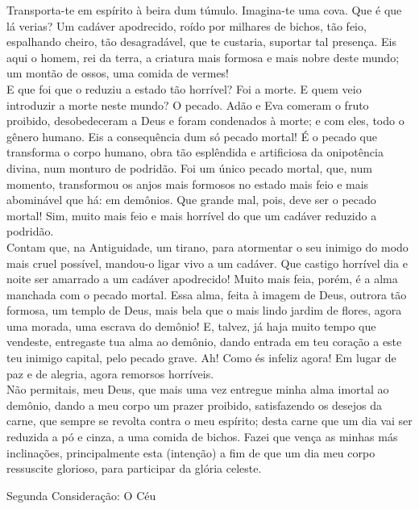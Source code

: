 \begin{flushleft}
    Transporta-te em espírito à beira dum túmulo. Imagina-te uma cova. Que é que lá verias? Um cadáver apodrecido, roído por milhares de bichos, tão feio, espalhando cheiro, tão desagradável, que te custaria, suportar tal presença. Eis aqui o homem, rei da terra, a criatura mais formosa e mais nobre deste mundo; um montão de ossos, uma comida de vermes!
    \vspace{.2cm} \\
    E que foi que o reduziu a estado tão horrível? Foi a morte. E quem veio introduzir a morte neste mundo? O pecado. Adão e Eva comeram o fruto proibido, desobedeceram a Deus e foram condenados à morte; e com eles, todo o gênero humano. Eis a consequência dum só pecado mortal! É o pecado que transforma o corpo humano, obra tão esplêndida e artificiosa da onipotência divina, num monturo de podridão. Foi um único pecado mortal, que, num momento, transformou os anjos mais formosos no estado mais feio e mais abominável que há: em demônios. Que grande mal, pois, deve ser o pecado mortal! Sim, muito mais feio e mais horrível do que um cadáver reduzido a podridão.
    \vspace{.2cm} \\
    Contam que, na Antiguidade, um tirano, para atormentar o seu inimigo do modo mais cruel possível, mandou-o ligar vivo a um cadáver. Que castigo horrível dia e noite ser amarrado a um cadáver apodrecido! Muito mais feia, porém, é a alma manchada com o pecado mortal. Essa alma, feita à imagem de Deus, outrora tão formosa, um templo de Deus, mais bela que o mais lindo jardim de flores, agora uma morada, uma escrava do demônio! E, talvez, já haja muito tempo que vendeste, entregaste tua alma ao demônio, dando entrada em teu coração a este teu inimigo capital, pelo pecado grave. Ah! Como és infeliz agora! Em lugar de paz e de alegria, agora remorsos horríveis.
    \vspace{.2cm} \\
    Não permitais, meu Deus, que mais uma vez entregue minha alma imortal ao demônio, dando a meu corpo um prazer proibido, satisfazendo os desejos da carne, que sempre se revolta contra o meu espírito; desta carne que um dia vai ser reduzida a pó e cinza, a uma comida de bichos. Fazei que vença as minhas más inclinações, principalmente esta \textcolor{VioletRed2}{(intenção)} a fim de que um dia meu corpo ressuscite glorioso, para participar da glória celeste.
\end{flushleft}
\newpage
\begin{center}
    \textcolor{VioletRed2}{Segunda Consideração: O Céu}
\end{center}
